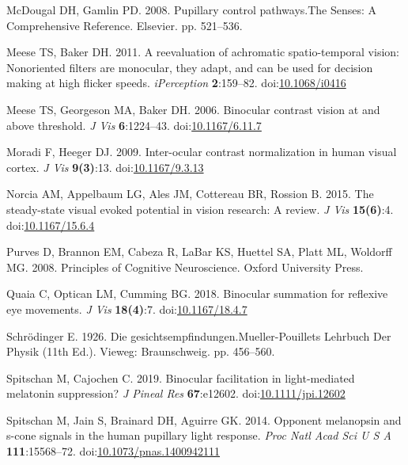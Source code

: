\documentclass[
]{article}
\newlength{\cslhangindent}
\newlength{\cslentryspacingunit} %
\newenvironment{CSLReferences}[2] %
 {%
  \setlength{\parindent}{0pt}
  \ifodd #1
  \let\oldpar\par
  \def\par{\hangindent=\cslhangindent\oldpar}
  \fi
  \setlength{\parskip}{#2\cslentryspacingunit}
 }%
 {}
\begin{document}
\begin{CSLReferences}{1}{0}
\leavevmode{}%
McDougal DH, Gamlin PD. 2008. Pupillary control pathways.The Senses: A Comprehensive Reference. Elsevier. pp. 521--536.

\leavevmode{}%
Meese TS, Baker DH. 2011. A reevaluation of achromatic spatio-temporal vision: Nonoriented filters are monocular, they adapt, and can be used for decision making at high flicker speeds. \emph{{iPerception}} \textbf{2}:159--82. doi:\href{https://doi.org/10.1068/i0416}{10.1068/i0416}

\leavevmode{}%
Meese TS, Georgeson MA, Baker DH. 2006. Binocular contrast vision at and above threshold. \emph{J Vis} \textbf{6}:1224--43. doi:\href{https://doi.org/10.1167/6.11.7}{10.1167/6.11.7}

\leavevmode{}%
Moradi F, Heeger DJ. 2009. Inter-ocular contrast normalization in human visual cortex. \emph{J Vis} \textbf{9(3)}:13. doi:\href{https://doi.org/10.1167/9.3.13}{10.1167/9.3.13}

\leavevmode{}%
Norcia AM, Appelbaum LG, Ales JM, Cottereau BR, Rossion B. 2015. The steady-state visual evoked potential in vision research: A review. \emph{J Vis} \textbf{15(6)}:4. doi:\href{https://doi.org/10.1167/15.6.4}{10.1167/15.6.4}

\leavevmode{}%
Purves D, Brannon EM, Cabeza R, LaBar KS, Huettel SA, Platt ML, Woldorff MG. 2008. Principles of {Cognitive} {Neuroscience}. Oxford University Press.

\leavevmode{}%
Quaia C, Optican LM, Cumming BG. 2018. Binocular summation for reflexive eye movements. \emph{J Vis} \textbf{18(4)}:7. doi:\href{https://doi.org/10.1167/18.4.7}{10.1167/18.4.7}

\leavevmode{}%
Schrödinger E. 1926. Die gesichtsempfindungen.Mueller-Pouillets Lehrbuch Der Physik (11th Ed.). Vieweg: Braunschweig. pp. 456--560.

\leavevmode{}%
Spitschan M, Cajochen C. 2019. Binocular facilitation in light-mediated melatonin suppression? \emph{J Pineal Res} \textbf{67}:e12602. doi:\href{https://doi.org/10.1111/jpi.12602}{10.1111/jpi.12602}

\leavevmode{}%
Spitschan M, Jain S, Brainard DH, Aguirre GK. 2014. Opponent melanopsin and s-cone signals in the human pupillary light response. \emph{Proc Natl Acad Sci U S A} \textbf{111}:15568--72. doi:\href{https://doi.org/10.1073/pnas.1400942111}{10.1073/pnas.1400942111}


\end{CSLReferences}
\end{document}
